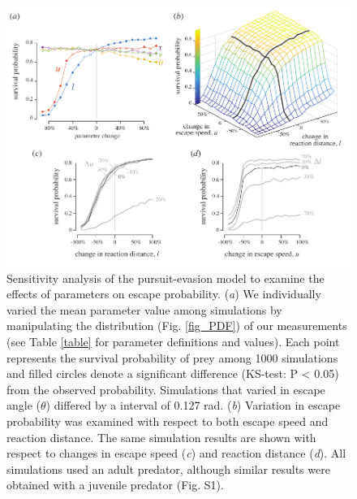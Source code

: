 \documentclass[]{rsos}%
\begin{document}
\begin{figure}[!h]
\centering
	\includegraphics[width=5.5in]{fig_sensitivity}
\caption{Sensitivity analysis of the pursuit-evasion model to examine the effects of parameters on escape probability.   
(\textit{a}) We individually varied the mean parameter value among simulations by manipulating the distribution (Fig. \ref{fig_PDF}) of our measurements (see Table \ref{table} for parameter definitions and values). 
Each point represents the survival probability of prey among 1000 simulations and filled circles denote a significant difference (KS-test: P < 0.05) from the observed probability.
Simulations that varied in escape angle ($\theta$) differed by a interval of 0.127 rad.
(\textit{b}) Variation in escape probability was examined with respect to both escape speed and reaction distance.
The same simulation results are shown with respect to changes in escape speed (\textit{c}) and reaction distance (\textit{d}). All simulations used an adult predator, although similar results were obtained with a juvenile predator (Fig. S1).
}
\label{fig_sense}
\end{figure}

\pagebreak
\end{document}
